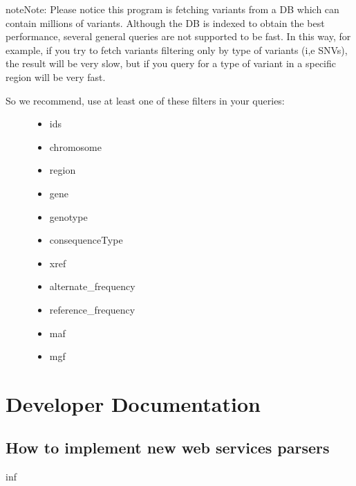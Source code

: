 \documentclass[letterpaper,10pt,english]{sphinxmanual}
\begin{document}
\begin{notice}{note}{Note:}
Please notice this program is fetching variants from a DB which can contain millions of variants.
Although the DB is indexed to obtain the best performance, several general queries are not supported to be
fast. In this way, for example,  if you try to fetch variants filtering only by type of variants (i,e SNVs),
the result will be very slow, but if you query for a type of variant in a specific region will be very fast.
\begin{description}
\item[{So we recommend, use at least one of these filters in your queries:}] \leavevmode\begin{itemize}
\item {} 
ids

\item {} 
chromosome

\item {} 
region

\item {} 
gene

\item {} 
genotype

\item {} 
consequenceType

\item {} 
xref

\item {} 
alternate\_frequency

\item {} 
reference\_frequency

\item {} 
maf

\item {} 
mgf

\end{itemize}

\end{description}
\end{notice}


\chapter{Developer Documentation}
\label{documentation:dev-docs}\label{documentation:developer-documentation}

\section{How to implement new web services parsers}
\label{new_web_services::doc}\label{new_web_services:how-to-implement-new-web-services-parsers}
inf



\renewcommand{\indexname}{Index}
\printindex
\end{document}
